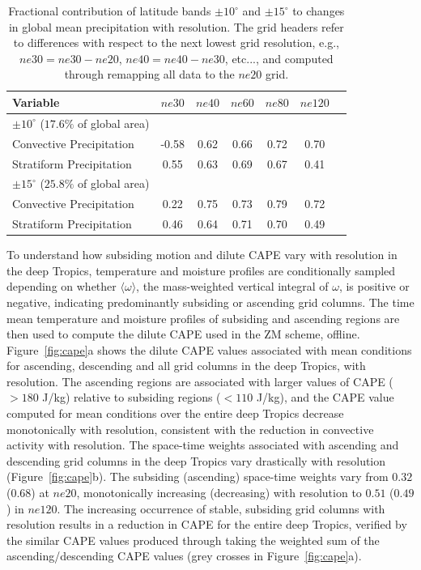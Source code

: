 \documentclass[times]{qjrms4}
\begin{document}
 \begin{table}
 \caption{Fractional contribution of latitude bands $\pm 10^{\circ}$ and $\pm 15^{\circ}$ to changes in global mean precipitation with resolution. The grid headers refer to differences with respect to the next lowest grid resolution, e.g., $ne30 = ne30-ne20$, $ne40=ne40-ne30$, etc..., and computed through remapping all data to the $ne20$ grid.}
 \centering
 \scriptsize
 \begin{tabular}{lcccccc}
   \hline
   Variable & $ne30$ & $ne40$ & $ne60$ & $ne80$ & $ne120$ \\ 
   \hline
   $\pm 10^{\circ}$ ($17.6\%$ of global area) \\
   Convective Precipitation & -0.58 & 0.62 & 0.66 & 0.72 & 0.70 \\
   Stratiform Precipitation & 0.55 & 0.63 & 0.69 & 0.67 & 0.41 \\ 
   \hline
   $\pm 15^{\circ}$ ($25.8\%$ of global area) \\
   Convective Precipitation & 0.22 & 0.75 & 0.73 & 0.79 & 0.72 \\
   Stratiform Precipitation & 0.46 & 0.64 & 0.71 & 0.70 & 0.49 \\      
 \hline
 \end{tabular}
 \label{tbl:table2}
 \end{table}

To understand how subsiding motion and dilute CAPE vary with resolution in the deep Tropics, temperature and moisture profiles are conditionally sampled depending on whether $\langle \omega \rangle$, the mass-weighted vertical integral of $\omega$, is positive or negative, indicating predominantly subsiding or ascending grid columns. The time mean temperature and moisture profiles of subsiding and ascending regions are then used to compute the dilute CAPE used in the ZM scheme, offline. Figure~\ref{fig:cape}a shows the dilute CAPE values associated with mean conditions for ascending, descending and all grid columns in the deep Tropics, with resolution. The ascending regions are associated with larger values of CAPE ($>180$ J/kg) relative to subsiding regions ($<110$ J/kg), and the CAPE value computed for mean conditions over the entire deep Tropics decrease monotonically with resolution, consistent with the reduction in convective activity with resolution. The space-time weights associated with ascending and descending grid columns in the deep Tropics vary drastically with resolution (Figure~\ref{fig:cape}b). The subsiding (ascending) space-time weights vary from $0.32$ ($0.68$) at $ne20$, monotonically increasing (decreasing) with resolution to $0.51$ ($0.49$) in $ne120$. The increasing occurrence of stable, subsiding grid columns with resolution results in a reduction in CAPE for the entire deep Tropics, verified by the similar CAPE values produced through taking the weighted sum of the ascending/descending CAPE values (grey crosses in Figure~\ref{fig:cape}a).
\end{document}
